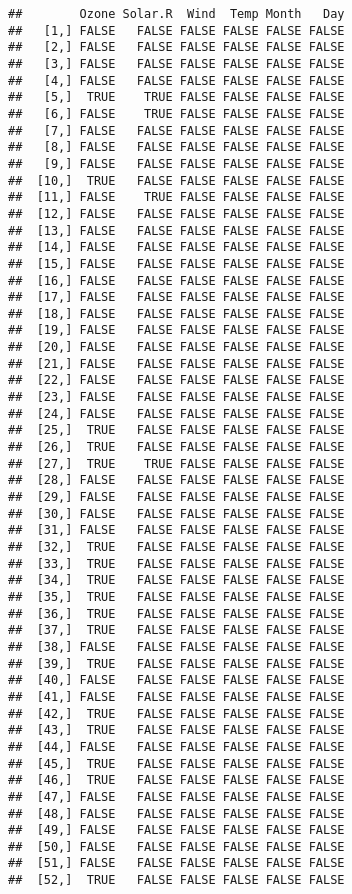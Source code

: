 \documentclass[
]{article}
\begin{document}
\begin{verbatim}
##        Ozone Solar.R  Wind  Temp Month   Day
##   [1,] FALSE   FALSE FALSE FALSE FALSE FALSE
##   [2,] FALSE   FALSE FALSE FALSE FALSE FALSE
##   [3,] FALSE   FALSE FALSE FALSE FALSE FALSE
##   [4,] FALSE   FALSE FALSE FALSE FALSE FALSE
##   [5,]  TRUE    TRUE FALSE FALSE FALSE FALSE
##   [6,] FALSE    TRUE FALSE FALSE FALSE FALSE
##   [7,] FALSE   FALSE FALSE FALSE FALSE FALSE
##   [8,] FALSE   FALSE FALSE FALSE FALSE FALSE
##   [9,] FALSE   FALSE FALSE FALSE FALSE FALSE
##  [10,]  TRUE   FALSE FALSE FALSE FALSE FALSE
##  [11,] FALSE    TRUE FALSE FALSE FALSE FALSE
##  [12,] FALSE   FALSE FALSE FALSE FALSE FALSE
##  [13,] FALSE   FALSE FALSE FALSE FALSE FALSE
##  [14,] FALSE   FALSE FALSE FALSE FALSE FALSE
##  [15,] FALSE   FALSE FALSE FALSE FALSE FALSE
##  [16,] FALSE   FALSE FALSE FALSE FALSE FALSE
##  [17,] FALSE   FALSE FALSE FALSE FALSE FALSE
##  [18,] FALSE   FALSE FALSE FALSE FALSE FALSE
##  [19,] FALSE   FALSE FALSE FALSE FALSE FALSE
##  [20,] FALSE   FALSE FALSE FALSE FALSE FALSE
##  [21,] FALSE   FALSE FALSE FALSE FALSE FALSE
##  [22,] FALSE   FALSE FALSE FALSE FALSE FALSE
##  [23,] FALSE   FALSE FALSE FALSE FALSE FALSE
##  [24,] FALSE   FALSE FALSE FALSE FALSE FALSE
##  [25,]  TRUE   FALSE FALSE FALSE FALSE FALSE
##  [26,]  TRUE   FALSE FALSE FALSE FALSE FALSE
##  [27,]  TRUE    TRUE FALSE FALSE FALSE FALSE
##  [28,] FALSE   FALSE FALSE FALSE FALSE FALSE
##  [29,] FALSE   FALSE FALSE FALSE FALSE FALSE
##  [30,] FALSE   FALSE FALSE FALSE FALSE FALSE
##  [31,] FALSE   FALSE FALSE FALSE FALSE FALSE
##  [32,]  TRUE   FALSE FALSE FALSE FALSE FALSE
##  [33,]  TRUE   FALSE FALSE FALSE FALSE FALSE
##  [34,]  TRUE   FALSE FALSE FALSE FALSE FALSE
##  [35,]  TRUE   FALSE FALSE FALSE FALSE FALSE
##  [36,]  TRUE   FALSE FALSE FALSE FALSE FALSE
##  [37,]  TRUE   FALSE FALSE FALSE FALSE FALSE
##  [38,] FALSE   FALSE FALSE FALSE FALSE FALSE
##  [39,]  TRUE   FALSE FALSE FALSE FALSE FALSE
##  [40,] FALSE   FALSE FALSE FALSE FALSE FALSE
##  [41,] FALSE   FALSE FALSE FALSE FALSE FALSE
##  [42,]  TRUE   FALSE FALSE FALSE FALSE FALSE
##  [43,]  TRUE   FALSE FALSE FALSE FALSE FALSE
##  [44,] FALSE   FALSE FALSE FALSE FALSE FALSE
##  [45,]  TRUE   FALSE FALSE FALSE FALSE FALSE
##  [46,]  TRUE   FALSE FALSE FALSE FALSE FALSE
##  [47,] FALSE   FALSE FALSE FALSE FALSE FALSE
##  [48,] FALSE   FALSE FALSE FALSE FALSE FALSE
##  [49,] FALSE   FALSE FALSE FALSE FALSE FALSE
##  [50,] FALSE   FALSE FALSE FALSE FALSE FALSE
##  [51,] FALSE   FALSE FALSE FALSE FALSE FALSE
##  [52,]  TRUE   FALSE FALSE FALSE FALSE FALSE

\end{verbatim}
\end{document}
